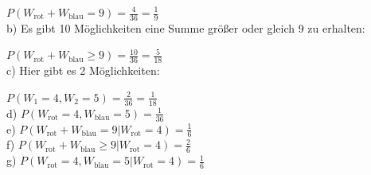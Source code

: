 \documentclass[
  bibliography=totoc,     %
  captions=tableheading,  %
  titlepage=firstiscover, %
]{scrartcl}
\begin{document}
$P(W_\text{rot}+W_\text{blau}=9) = \frac{4}{36} = \frac{1}{9}$\\

\noindent
b) Es gibt 10 Möglichkeiten eine Summe größer oder gleich 9 zu erhalten:

$P(W_\text{rot}+W_\text{blau} \geq 9) = \frac{10}{36} = \frac{5}{18}$\\

\noindent
c) Hier gibt es 2 Möglichkeiten:

$P(W_1=4, W_2=5) = \frac{2}{36} = \frac{1}{18}$\\

\noindent
d) $P(W_\text{rot}=4, W_\text{blau}=5) = \frac{1}{36}$\\

\noindent
e) $P(W_\text{rot}+W_\text{blau}=9|W_\text{rot}=4) = \frac{1}{6}$\\

\noindent
f) $P(W_\text{rot}+W_\text{blau} \geq 9|W_\text{rot}=4) = \frac{2}{6}$\\

\noindent
g) $P(W_\text{rot}=4, W_\text{blau}=5|W_\text{rot}=4) = \frac{1}{6}$
\end{document}
